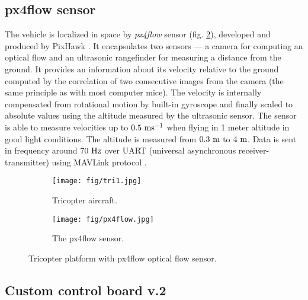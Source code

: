\subsection{px4flow sensor}
\label{cap:px4flow}

The vehicle is localized in space by \textit{px4flow} sensor \citep{px4flow} (fig. \ref{fig:px4flow}), developed and produced by PixHawk \citep{pixhawk}. It encapsulates two sensors --- a camera for computing an optical flow and an ultrasonic rangefinder for measuring a distance from the ground. It provides an information about its velocity relative to the ground computed by the correlation of two consecutive images from the camera (the same principle as with most computer mice). The velocity is internally compensated from rotational motion by built-in gyroscope and finally scaled to absolute values using the altitude measured by the ultrasonic sensor. The sensor is able to measure velocities up to $0.5~\mathrm{ms^{-1}}$ when flying in 1 meter altitude in good light conditions. The altitude is measured from $0.3~\mathrm{m}$ to $4~\mathrm{m}$. Data is sent in frequency around $70~\mathrm{Hz}$ over UART (universal asynchronous receiver-transmitter) using MAVLink protocol \citep{px4flow}.

\begin{figure}[tbp]
\centering

\begin{subfigure}[b]{0.55\textwidth}
	\texttt{[image: fig/tri1.jpg]}
	\caption{Tricopter aircraft.}
	\label{fig:tricopter}
\end{subfigure}%
\begin{subfigure}[b]{0.45\textwidth}
	\texttt{[image: fig/px4flow.jpg]}
	\caption{The px4flow sensor.}
	\label{fig:px4flow}
\end{subfigure}

\caption{Tricopter platform with px4flow optical flow sensor.}
\label{fig:tricopter_px4flow}
\end{figure}

\subsection{Custom control board v.2}

